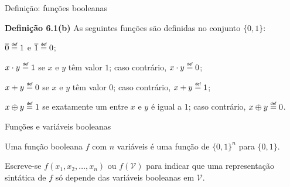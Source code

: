 \expandafter\documentclass\expandafter[table, usenames, svgnames, dvipsnames,14pt, \classopts]{beamer}
\newcommand\defeq{\mathrel{\overset{\makebox[0pt]{\mbox{\normalfont\tiny\sffamily def}}}{=}}}
\begin{document}
\begin{frame}{Definição: funções booleanas}

    \begin{block}{\textbf{Definição 6.1(b)}}
        As seguintes funções são definidas no conjunto $\{0,1\}$:
        \\
        \begin{outline}
            \1 $\overline{0} \defeq 1$ e $\overline{1} \defeq 0$;
                
            \1 $x \cdot y \defeq 1$ se $x$ e $y$ têm valor $1$; caso contrário, $x \cdot y \defeq 0$;
            
            \1 $x + y \defeq 0$ se $x$ e $y$ têm valor $0$; caso contrário, $x + y \defeq 1$;
            
            \1 $x \oplus y \defeq 1$ se exatamente um entre $x$ e $y$ é igual a $1$; caso contrário, $x \oplus y \defeq 0$.
        \end{outline}        
        
    \end{block}

\end{frame}

\begin{frame}{Funções e variáveis booleanas}

    \begin{outline}
        \1 Uma função booleana $f$ com $n$ variáveis é uma função de $\{0,1\}^n$ para $\{0,1\}$.
        
        \vspace{1em}
        
        \1 Escreve-se $f(x_1,x_2,\dots,x_n)$ ou $f(\mathcal{V})$ para indicar que uma representação sintática de $f$ só depende das variáveis booleanas em $\mathcal{V}$.
    \end{outline}
    
\end{frame}
\end{document}

